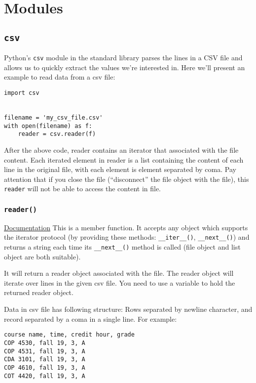 \documentclass[12pt]{book}
\date{\today}
\title{}
\begin{document}
\tableofcontents

\part{Modules}
\label{sec:orgd8b1e15}
\chapter{\texttt{csv}}
\label{sec:org501af71}
Python's \texttt{csv} module in the standard library parses the lines in a CSV file and allows us to quickly extract the values we're interested in. Here we'll present an example to read data from a csv file:
\begin{verbatim}
import csv


filename = 'my_csv_file.csv'
with open(filename) as f:
    reader = csv.reader(f)
\end{verbatim}
After the above code, reader contains an iterator that associated with the file content. Each iterated element in reader is a list containing the content of each line in the original file, with each element is element separated by coma. Pay attention that if you close the file (``disconnect'' the file object with the file), this \texttt{reader} will not be able to access the content in file.

\section{\texttt{reader()}}
\label{sec:org942f3d4}
\href{https://docs.python.org/3/library/csv.html\#csv.reader}{Documentation}
This is a member function. It accepts any object which supports the iterator protocol (by providing these methods: \texttt{\_\_iter\_\_()}, \texttt{\_\_next\_\_()}) and returns a string each time its \texttt{\_\_next\_\_()} method is called (file object and list object are both suitable).

It will return a reader object associated with the file. The reader object will iterate over lines in the given csv file. You need to use a variable to hold the returned reader object.

Data in csv file has following structure: Rows separated by newline character, and record separated by a coma in a single line. For example:
\begin{verbatim}
course name, time, credit hour, grade
COP 4530, fall 19, 3, A
COP 4531, fall 19, 3, A
CDA 3101, fall 19, 3, A
COP 4610, fall 19, 3, A
COT 4420, fall 19, 3, A
\end{verbatim}
\end{document}

